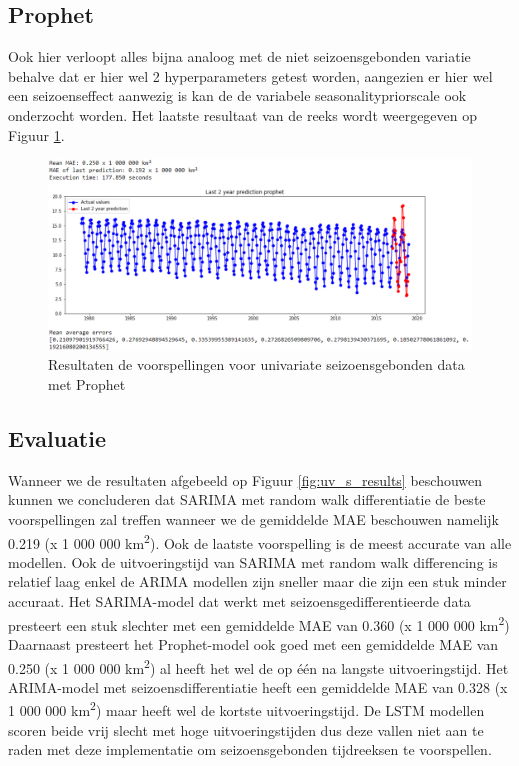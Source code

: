 \clearpage
\subsection{Prophet}

Ook hier verloopt alles bijna analoog met de niet seizoensgebonden variatie behalve dat er hier wel 2 hyperparameters getest worden, aangezien er hier wel een seizoenseffect aanwezig is kan de de variabele seasonality\textunderscore prior\textunderscore scale ook onderzocht worden. Het laatste resultaat van de reeks wordt weergegeven op Figuur \ref{fig:uvsprophet}.

\begin{figure}
    \centering
    \caption{Resultaten de voorspellingen voor univariate seizoensgebonden data met Prophet}
    \label{fig:uvsprophet}
    \includegraphics[width=1\linewidth]{uv_s_prophet}
\end{figure}

\clearpage
\subsection{Evaluatie}

Wanneer we de resultaten afgebeeld op Figuur \ref{fig:uv_s_results} beschouwen kunnen we concluderen dat SARIMA met random walk differentiatie de beste voorspellingen zal treffen wanneer we de gemiddelde MAE beschouwen namelijk 0.219 (x 1 000 000 km\textsuperscript{2}). Ook de laatste voorspelling is de meest accurate van alle modellen. Ook de uitvoeringstijd van SARIMA met random walk differencing is relatief laag enkel de ARIMA modellen zijn sneller maar die zijn een stuk minder accuraat.
Het SARIMA-model dat werkt met seizoensgedifferentieerde data presteert een stuk slechter met een gemiddelde MAE van 0.360 (x 1 000 000 km\textsuperscript{2})
\\

Daarnaast presteert het Prophet-model ook goed met een gemiddelde MAE van 0.250 (x 1 000 000 km\textsuperscript{2}) al heeft het wel de op \'{e}\'{e}n na langste uitvoeringstijd. Het ARIMA-model met seizoensdifferentiatie heeft een gemiddelde MAE van 0.328 (x 1 000 000 km\textsuperscript{2}) maar heeft wel de kortste uitvoeringstijd.
De LSTM modellen scoren beide vrij slecht met hoge uitvoeringstijden dus deze vallen niet aan te raden met deze implementatie om seizoensgebonden tijdreeksen te voorspellen.
\\

